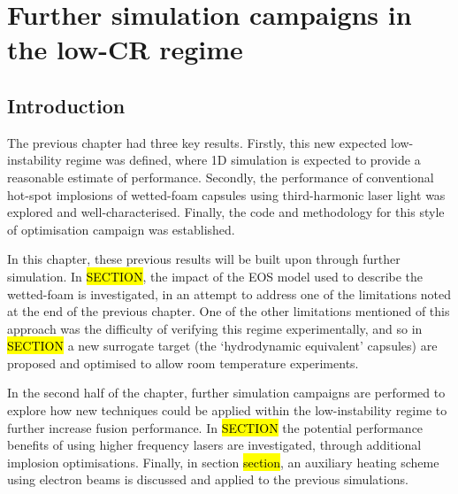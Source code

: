 

\chapter{\label{ch-FurtherSims} Further simulation campaigns in the low-CR regime}

\minitoc

\section{Introduction}
The previous chapter had three key results. Firstly, this new expected low-instability regime was defined, where 1D simulation is expected to provide a reasonable estimate of performance. Secondly, the performance of conventional hot-spot implosions of wetted-foam capsules using third-harmonic laser light was explored and well-characterised. Finally, the code and methodology for this style of optimisation campaign was established.

In this chapter, these previous results will be built upon through further simulation.  In \hl{SECTION}, the impact of the EOS model used to describe the wetted-foam is investigated, in an attempt to address one of the limitations noted at the end of the previous chapter. One of the other limitations mentioned of this approach was the difficulty of verifying this regime experimentally, and so in \hl{SECTION} a new surrogate target (the `hydrodynamic equivalent' capsules) are proposed and optimised to allow room temperature experiments.

In the second half of the chapter, further simulation campaigns are performed to explore how new techniques could be applied within the low-instability regime to further increase fusion performance. In \hl{SECTION} the potential performance benefits of using higher frequency lasers are investigated, through additional implosion optimisations. Finally, in section \hl{section}, an auxiliary heating scheme using electron beams is discussed and applied to the previous simulations.

